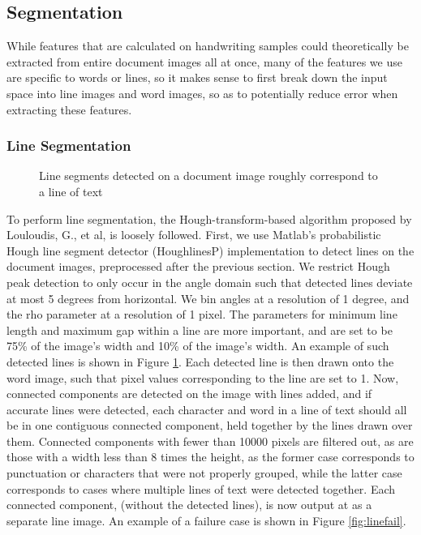 \documentclass[paper=a4, fontsize=11pt]{scrartcl} %
\numberwithin{equation}{section} %
\numberwithin{figure}{section} %
\numberwithin{table}{section} %
\begin{document}
\subsection{Segmentation}
While features that are calculated on handwriting samples could
theoretically be extracted from entire document images all at once,
many of the features we use are specific to words or lines, so it
makes sense to first break down the input space into line images and
word images, so as to potentially reduce error when extracting these
features.

\subsubsection{Line Segmentation}

\begin{figure}
  \caption{Line segments detected on a document image roughly
    correspond to a line of text}
\label{fig:houghLineDetect}
\end{figure}

To perform line segmentation, the Hough-transform-based algorithm
proposed by Louloudis, G., et al, \cite{BlockBased} is loosely
followed. First, we use Matlab's probabilistic Hough line segment
detector (HoughlinesP) implementation to detect lines on the document
images, preprocessed after the previous section. We restrict Hough
peak detection to only occur in the angle domain such that detected
lines deviate at most 5 degrees from horizontal. We bin angles at a
resolution of 1 degree, and the rho parameter at a resolution of 1
pixel. The parameters for minimum line length and maximum gap within a
line are more important, and are set to be 75\% of the image's width
and 10\% of the image's width. An example of such detected lines is
shown in Figure \ref{fig:houghLineDetect}. Each detected line is then
drawn onto the word image, such that pixel values corresponding to the
line are set to 1. Now, connected components are detected on the image
with lines added, and if accurate lines were detected, each character
and word in a line of text should all be in one contiguous connected
component, held together by the lines drawn over them. Connected
components with fewer than 10000 pixels are filtered out, as are those
with a width less than 8 times the height, as the former case
corresponds to punctuation or characters that were not properly
grouped, while the latter case corresponds to cases where multiple
lines of text were detected together. Each connected component,
(without the detected lines), is now output at as a separate line
image. An example of a failure case is shown in Figure \ref{fig:linefail}.
\end{document}
